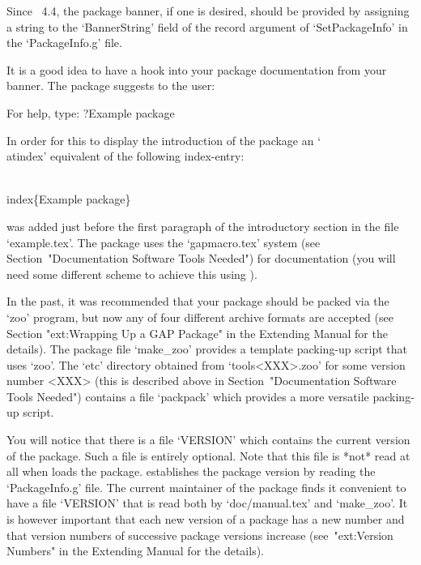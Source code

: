 Since {\GAP}~4.4, the package  banner,  if  one  is  desired,  should  be
provided by assigning a string to the `BannerString' field of the  record
argument of `SetPackageInfo' in the `PackageInfo.g' file.

It is a good idea to have a hook into  your  package  documentation  from
your banner. The {\Example} package suggests to the {\GAP} user:

\begintt
For help, type: ?Example package
\endtt

In order for this to display the introduction of the  {\Example}  package
an `\\atindex' equivalent of the following index-entry:

\)\\index\{Example package\}

was added just before the first paragraph of the introductory section  in
the file `example.tex'. The {\Example} package  uses  the  `gapmacro.tex'
system  (see   Section~"Documentation   Software   Tools   Needed")   for
documentation (you will need some different scheme to achieve this  using
).


In the past, it was recommended that your {\GAP} package should be packed
via the `zoo' program, but now any of four different archive formats  are
accepted (see Section "ext:Wrapping Up a GAP Package"  in  the  Extending
{\GAP} Manual for the details). The {\Example}  package  file  `make_zoo'
provides  a  template  packing-up  script  that  uses  `zoo'.  The  `etc'
directory obtained from `tools<XXX>.zoo' for some  version  number  <XXX>
(this  is  described  above  in  Section~"Documentation  Software   Tools
Needed") contains a file  `packpack'  which  provides  a  more  versatile
packing-up script.


You will notice that there is a file `VERSION' which contains the current
version of the {\Example} package. Such a file is entirely optional. Note
that this file is *not* read at all when {\GAP} loads the package. {\GAP}
establishes the package version by reading the `PackageInfo.g' file.  The
current maintainer of the {\Example} package finds it convenient to  have
a file `VERSION' that is read both by `doc/manual.tex' and `make_zoo'. It
is however important that each new version of a package has a new  number
and  that  version  numbers  of  successive  package  versions   increase
(see~"ext:Version  Numbers"  in  the  Extending  {\GAP}  Manual  for  the
details).

